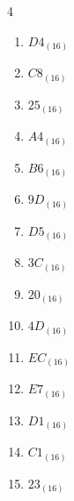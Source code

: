 \begin{multicols}{4}
\begin{enumerate}
\resetques

  \item $D4_{(16)}$

        \phantom{$=212$}

  \item $C8_{(16)}$

        \phantom{$=200$}

  \item $25_{(16)}$

        \phantom{$=37$}

  \item $A4_{(16)}$

        \phantom{$=164$}

  \item $B6_{(16)}$

        \phantom{$=182$}

  \item $9D_{(16)}$

        \phantom{$=157$}

  \item $D5_{(16)}$

        \phantom{$=213$}

  \item $3C_{(16)}$

        \phantom{$=60$}

  \item $20_{(16)}$

        \phantom{$=32$}

  \item $4D_{(16)}$

        \phantom{$=77$}

  \item $EC_{(16)}$

        \phantom{$=236$}

  \item $E7_{(16)}$

        \phantom{$=231$}

  \item $D1_{(16)}$

        \phantom{$=209$}

  \item $C1_{(16)}$

        \phantom{$=193$}

  \item $23_{(16)}$

        \phantom{$=35$}

\columnbreak %


\end{enumerate}
\end{multicols}
